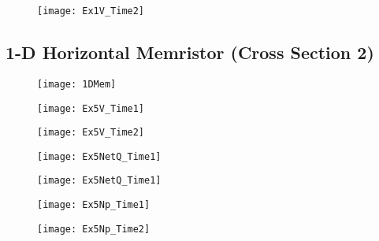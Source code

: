 \begin{landscape}
\begin{figure}[!htp]
\centering
\texttt{[image: Ex1V\_Time2]}
\caption{} 
\label{}
\end{figure}
\end{landscape}

\clearpage
\subsection{1-D Horizontal Memristor (Cross Section 2)}

\begin{figure}[!htp]
\centering
\texttt{[image: 1DMem]}
\caption{} 
\label{}
\end{figure}


\begin{landscape}
\begin{figure}[!htp]
\centering
\texttt{[image: Ex5V\_Time1]}
\caption{} 
\label{}
\end{figure}
\end{landscape}

\begin{landscape}
\begin{figure}[!htp]
\centering
\texttt{[image: Ex5V\_Time2]}
\caption{} 
\label{}
\end{figure}
\end{landscape}

\begin{landscape}
\begin{figure}[!htp]
\centering
\texttt{[image: Ex5NetQ\_Time1]}
\caption{} 
\label{}
\end{figure}
\end{landscape}

\begin{landscape}
\begin{figure}[!htp]
\centering
\texttt{[image: Ex5NetQ\_Time1]}
\caption{} 
\label{}
\end{figure}
\end{landscape}

\begin{landscape}
\begin{figure}[!htp]
\centering
\texttt{[image: Ex5Np\_Time1]}
\caption{} 
\label{}
\end{figure}
\end{landscape}

\begin{landscape}
\begin{figure}[!htp]
\centering
\texttt{[image: Ex5Np\_Time2]}
\caption{} 
\label{}
\end{figure}
\end{landscape}

